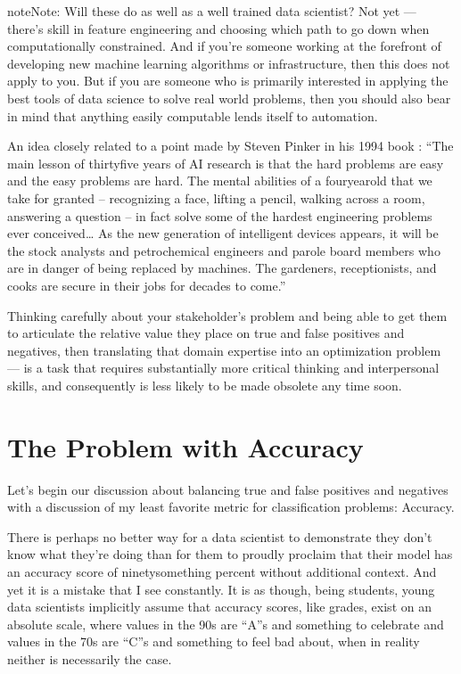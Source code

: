 \documentclass[letterpaper,10pt,english]{jupyterBook}
\begin{document}
\begin{sphinxadmonition}{note}{Note:}
\sphinxAtStartPar
Will these do as well as a well trained data scientist? Not yet — there’s skill in feature engineering and choosing which path to go down when computationally constrained. And if you’re someone working at the forefront of developing new machine learning algorithms or infrastructure, then this does not apply to you. But if you are someone who is primarily interested in applying the best tools of data science to solve real world problems, then you should also bear in mind that anything easily computable lends itself to automation.%
\begin{footnote}[1]\sphinxAtStartFootnote
An idea closely related to a point made by Steven Pinker in his 1994 book : “The main lesson of thirty\sphinxhyphen{}five years of AI research is that the hard problems are easy and the easy problems are hard. The mental abilities of a four\sphinxhyphen{}year\sphinxhyphen{}old that we take for granted – recognizing a face, lifting a pencil, walking across a room, answering a question – in fact solve some of the hardest engineering problems ever conceived… As the new generation of intelligent devices appears, it will be the stock analysts and petrochemical engineers and parole board members who are in danger of being replaced by machines. The gardeners, receptionists, and cooks are secure in their jobs for decades to come.”
%
\end{footnote}

\sphinxAtStartPar
Thinking carefully about your stakeholder’s problem and being able to get them to articulate the relative value they place on true and false positives and negatives, then translating that domain expertise into an optimization problem —  is a task that requires substantially more critical thinking and interpersonal skills, and consequently is less likely to be made obsolete any time soon.
\end{sphinxadmonition}


\section{The Problem with Accuracy}
\label{\detokenize{30_questions/24_passive_internal_errors:the-problem-with-accuracy}}
\sphinxAtStartPar
Let’s begin our discussion about balancing true and false positives and negatives with a discussion of my least favorite metric for classification problems: Accuracy.

\sphinxAtStartPar
There is perhaps no better way for a data scientist to demonstrate they don’t know what they’re doing than for them to proudly proclaim that their model has an accuracy score of ninety\sphinxhyphen{}something percent without additional context. And yet it is a mistake that I see constantly. It is as though, being students, young data scientists implicitly assume that accuracy scores, like grades, exist on an absolute scale, where values in the 90s are “A”s and something to celebrate and values in the 70s are “C”s and something to feel bad about, when in reality neither is necessarily the case.
\end{document}
